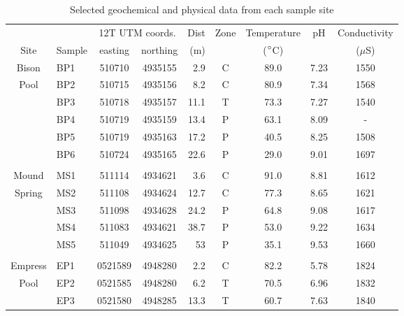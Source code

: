 \singlespace
\begin{table}[htbp]
\begin{adjustbox}{width=\textwidth,keepaspectratio}
\begin{threeparttable}
  \caption{Selected geochemical and physical data from each sample site}
\begin{tabular}{clccrcccc}
\toprule
      &       & \multicolumn{2}{c}{12T UTM coords.} & Dist\tnote{a} & Zone\tnote{b} & Temperature & pH    & Conductivity\tnote{c} \\
\cmidrule{3-4}Site  & Sample & easting & northing & (m)   &       & ($\degree$C) &       & ($\mu$S) \\
\midrule
Bison & BP1   & 510710 & 4935155 & 2.9   & C     & 89.0  & 7.23  & 1550 \\
Pool  & BP2   & 510715 & 4935156 & 8.2   & C     & 80.9  & 7.34  & 1568 \\
      & BP3   & 510718 & 4935157 & 11.1  & T     & 73.3  & 7.27  & 1540 \\
      & BP4   & 510719 & 4935159 & 13.4  & P     & 63.1  & 8.09  & - \\
      & BP5   & 510719 & 4935163 & 17.2  & P     & 40.5  & 8.25  & 1508 \\
      & BP6   & 510724 & 4935165 & 22.6  & P     & 29.0  & 9.01  & 1697 \\
      &       &       &       &       &       &       &       &  \\
Mound & MS1   & 511114 & 4934621 & 3.6   & C     & 91.0  & 8.81  & 1612 \\
Spring & MS2   & 511108 & 4934624 & 12.7  & C     & 77.3  & 8.65  & 1621 \\
      & MS3   & 511098 & 4934628 & 24.2  & P     & 64.8  & 9.08  & 1617 \\
      & MS4   & 511083 & 4934621 & 38.7  & P     & 53.0  & 9.22  & 1634 \\
      & MS5   & 511049 & 4934625 & 53    & P     & 35.1  & 9.53  & 1660 \\
      &       &       &       &       &       &       &       &  \\
Empress & EP1   & 0521589 & 4948280 & 2.2   & C     & 82.2  & 5.78  & 1824 \\
Pool  & EP2   & 0521585 & 4948280 & 6.2   & T     & 70.5  & 6.96  & 1832 \\
      & EP3   & 0521580 & 4948285 & 13.3  & T     & 60.7  & 7.63  & 1840 \\

\end{tabular}
\end{threeparttable}
\end{adjustbox}
\end{table}
